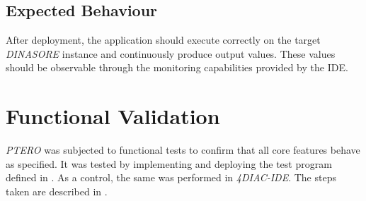 \subsection{Expected Behaviour}
After deployment, the application should execute correctly on the target \textit{DINASORE} instance and continuously produce output values. These values should be observable through the monitoring capabilities provided by the \ac{IDE}.

\section{Functional Validation}
\textit{PTERO} was subjected to functional tests to confirm that all core features behave as specified. It was tested by implementing and deploying the test program defined in . As a control, the same was performed in \textit{4DIAC-IDE}. The steps taken are described in .

